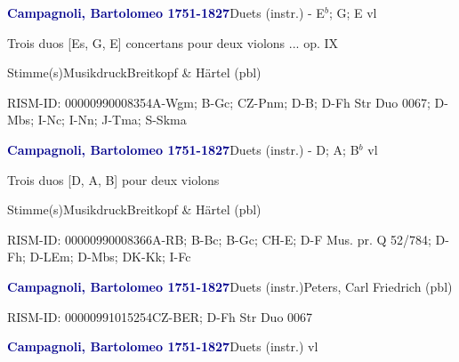 \documentclass[twocolumn, 12pt]{book}
\begin{document}
\par \vspace{16pt} \textcolor{darkblue}{\textbf{Campagnoli, Bartolomeo  1751-1827}}\hfillplus{\textbf{[257]}}\newline Duets (instr.) - E$^b$; G; E vl
\par \begin{itshape}Trois duos [Es, G, E] concertans pour deux violons ... op. IX\end{itshape} 
\par \textcolor{darkblue}{}  Stimme(s)\newline Musikdruck\newline Breitkopf \& Härtel  (pbl)
\par RISM-ID: 00000990008354\newline A-Wgm; B-Gc; CZ-Pnm; D-B; D-Fh  Str Duo 0067; D-Mbs; I-Nc; I-Nn; J-Tma; S-Skma
\par \vspace{16pt} \textcolor{darkblue}{\textbf{Campagnoli, Bartolomeo  1751-1827}}\hfillplus{\textbf{[258]}}\newline Duets (instr.) - D; A; B$^b$ vl
\par \begin{itshape}Trois duos [D, A, B] pour deux violons\end{itshape} 
\par \textcolor{darkblue}{}  Stimme(s)\newline Musikdruck\newline Breitkopf \& Härtel  (pbl)
\par RISM-ID: 00000990008366\newline A-RB; B-Bc; B-Gc; CH-E; D-F  Mus. pr. Q 52/784; D-Fh; D-LEm; D-Mbs; DK-Kk; I-Fc
\par \vspace{16pt} \textcolor{darkblue}{\textbf{Campagnoli, Bartolomeo  1751-1827}}\hfillplus{\textbf{[259]}}\newline Duets (instr.)\newline Peters, Carl Friedrich  (pbl)
\par RISM-ID: 00000991015254\newline CZ-BER; D-Fh  Str Duo 0067
\par \vspace{16pt} \textcolor{darkblue}{\textbf{Campagnoli, Bartolomeo  1751-1827}}\hfillplus{\textbf{[260]}}\newline Duets (instr.) vl
\end{document}
